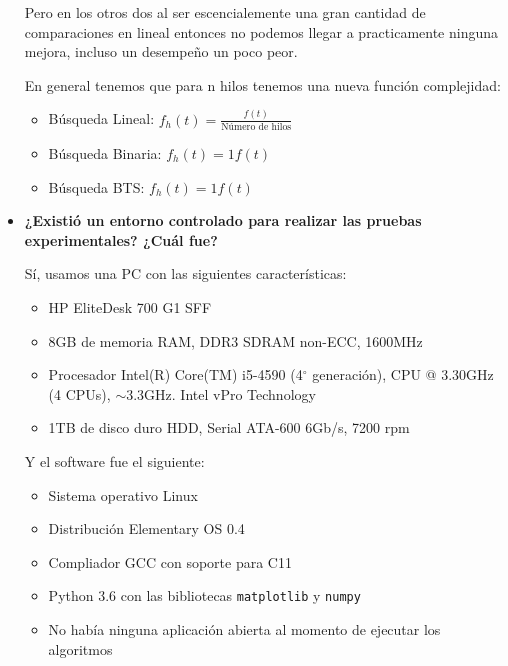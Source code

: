\documentclass[12pt, fleqn]{article}                             %
\theoremstyle{break}                                            %
\begin{document}
\begin{itemize}
                Pero en los otros dos al ser escencialemente una gran cantidad de comparaciones en lineal
                entonces no podemos llegar a practicamente ninguna mejora, incluso un desempeño un poco peor.

                En general tenemos que para n hilos tenemos una nueva función complejidad:
                \begin{itemize}
                    \item Búsqueda Lineal: $f_h(t) = \frac{f(t)}{\text{Número de hilos}}$
                    \item Búsqueda Binaria: $f_h(t) = 1 f(t)$
                    \item Búsqueda BTS: $f_h(t) = 1 f(t)$
                \end{itemize}

            \clearpage

            \item
                \textbf{¿Existió un entorno controlado para realizar las pruebas experimentales?
                ¿Cuál fue?}

                Sí, usamos una PC con las siguientes características:
                \begin{itemize}\setlength\itemsep{0em}
                    \item HP EliteDesk 700 G1 SFF
                    \item 8GB de memoria RAM, DDR3 SDRAM non-ECC, 1600MHz
                    \item Procesador Intel(R) Core(TM) i5-4590 (4$^\circ$ generación), CPU @ 3.30GHz (4 CPUs), $\sim$3.3GHz. Intel vPro Technology
                    \item 1TB de disco duro HDD, Serial ATA-600 6Gb/s, 7200 rpm
                \end{itemize}
                
                Y el software fue el siguiente:
                \begin{itemize}\setlength\itemsep{0em}
                    \item Sistema operativo Linux
                    \item Distribución Elementary OS 0.4
                    \item Compliador GCC con soporte para C11
                    \item Python 3.6 con las bibliotecas \texttt{matplotlib} y \texttt{numpy}
                    \item No había ninguna aplicación abierta al momento de ejecutar los algoritmos
                \end{itemize}


\end{itemize}
\end{document}
